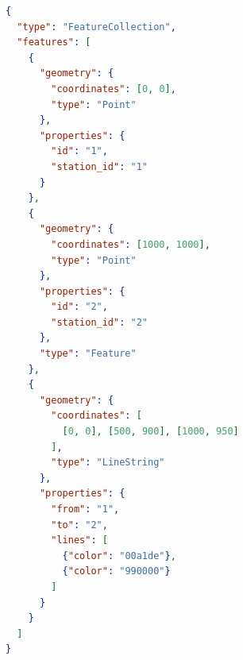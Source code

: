 \documentclass[10pt,a4paper]{article}
\begin{document}
\begin{lstlisting}[language=json,firstnumber=1]
{
  "type": "FeatureCollection",
  "features": [
    {
      "geometry": {
        "coordinates": [0, 0],
        "type": "Point"
      },
      "properties": {
        "id": "1",
        "station_id": "1"
      }
    },
    {
      "geometry": {
        "coordinates": [1000, 1000],
        "type": "Point"
      },
      "properties": {
        "id": "2",
        "station_id": "2"
      },
      "type": "Feature"
    },
    {
      "geometry": {
        "coordinates": [
          [0, 0], [500, 900], [1000, 950]
        ],
        "type": "LineString"
      },
      "properties": {
        "from": "1",
        "to": "2",
        "lines": [
          {"color": "00a1de"},
          {"color": "990000"}
        ]
      }
    }
  ]
}
\end{lstlisting}
\end{document}
